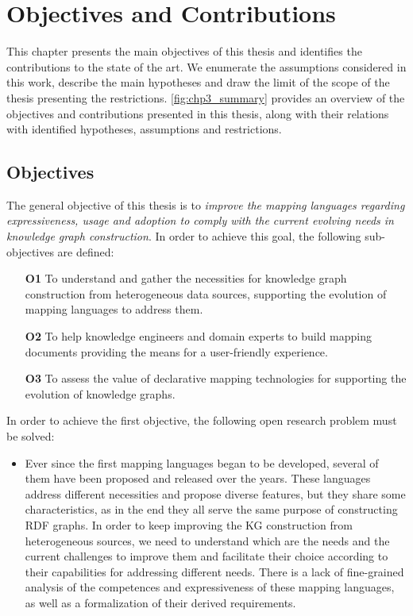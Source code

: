 \chapter{Objectives and Contributions}
\label{chapter:objectives}

This chapter presents the main objectives of this thesis and identifies the contributions to the state of the art. We enumerate the assumptions considered in this work, describe the main hypotheses and draw the limit of the scope of the thesis presenting the restrictions. \cref{fig:chp3_summary} provides an overview of the objectives and contributions presented in this thesis, along with their relations with identified hypotheses, assumptions and restrictions. 

\section{Objectives}
\label{sec:chp3-objectives}

The general objective of this thesis is to \textit{improve the mapping languages regarding expressiveness, usage and adoption to comply with the current evolving needs in knowledge graph construction}. In order to achieve this goal, the following sub-objectives are defined:

\begin{enumerate}
    \item[\textbf{O1}] To understand and gather the necessities for knowledge graph construction from heterogeneous data sources, supporting the evolution of mapping languages to address them. 
    \item[\textbf{O2}] To help knowledge engineers and domain experts to build mapping documents providing the means for a user-friendly experience.
    \item[\textbf{O3}] To assess the value of declarative mapping technologies for supporting the evolution of knowledge graphs. 
\end{enumerate}

In order to achieve the first objective, the following open research problem must be solved:
\begin{itemize}
    \item Ever since the first mapping languages began to be developed, several of them have been proposed and released over the years. These languages address different necessities and propose diverse features, but they share some characteristics, as in the end they all serve the same purpose of constructing RDF graphs. In order to keep improving the KG construction from heterogeneous sources, we need to understand which are the needs and the current challenges to improve them and facilitate their choice according to their capabilities for addressing different needs. There is a lack of fine-grained analysis of the competences and expressiveness of these mapping languages, as well as a formalization of their derived requirements. 
\end{itemize}

